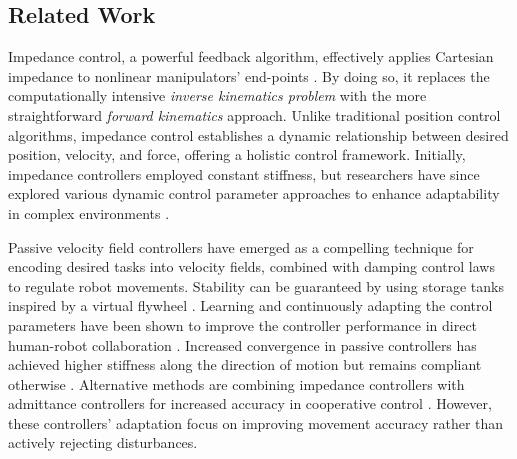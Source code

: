 \subsection{Related Work}
Impedance control, a powerful feedback algorithm, effectively applies Cartesian impedance to nonlinear manipulators' end-points \cite{takegaki1981new, hogan1985impedance}. By doing so, it replaces the computationally intensive \textit{inverse kinematics problem} with the more straightforward \textit{forward kinematics} approach. Unlike traditional position control algorithms, impedance control establishes a dynamic relationship between desired position, velocity, and force, offering a holistic control framework.
Initially, impedance controllers employed constant stiffness, but researchers have since explored various dynamic control parameter approaches to enhance adaptability in complex environments \cite{vanderborght2013variable, abu2020variable}.

Passive velocity field controllers have emerged as a compelling technique for encoding desired tasks into velocity fields, combined with damping control laws to regulate robot movements. Stability can be guaranteed by using storage tanks inspired by a virtual flywheel \cite{li1999passive}. 
Learning and continuously adapting the control parameters have been shown to improve the controller performance in direct human-robot collaboration 
\cite{gribovskaya2011motion}.
Increased convergence in passive controllers has achieved higher stiffness along the direction of motion but remains compliant otherwise \cite{kronander2015passive}. 
Alternative methods are combining impedance controllers with admittance controllers for increased accuracy in cooperative control
\cite{fujiki2022series}.
However, these controllers' adaptation focus on improving movement accuracy rather than actively rejecting disturbances.

